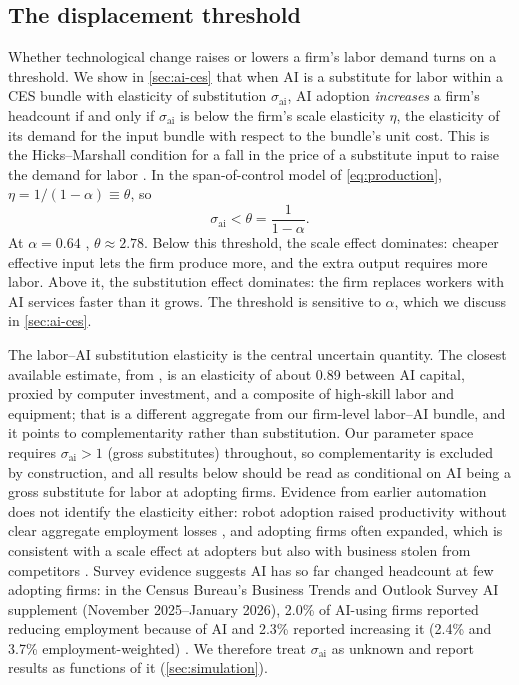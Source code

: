 \subsection{The displacement threshold}\label{sec:theory-threshold}

Whether technological change raises or lowers a firm's labor demand turns on a threshold.
We show in \cref{sec:ai-ces} that when AI is a substitute for labor within a CES bundle with elasticity of substitution $\sigma_{\text{ai}}$, AI adoption \emph{increases} a firm's headcount if and only if $\sigma_{\text{ai}}$ is below the firm's scale elasticity $\eta$, the elasticity of its demand for the input bundle with respect to the bundle's unit cost.
This is the Hicks--Marshall condition for a fall in the price of a substitute input to raise the demand for labor \citep{hamermesh1993labor}.
In the span-of-control model of \cref{eq:production}, $\eta = 1/(1-\alpha) \equiv \theta$, so
\begin{equation}\label{eq:threshold}
  \sigma_{\text{ai}} < \theta = \frac{1}{1-\alpha}.
\end{equation}
At $\alpha = 0.64$ \citep[the value in][]{hopenhayn1993job}, $\theta \approx 2.78$.
Below this threshold, the scale effect dominates: cheaper effective input lets the firm produce more, and the extra output requires more labor.
Above it, the substitution effect dominates: the firm replaces workers with AI services faster than it grows.
The threshold is sensitive to $\alpha$, which we discuss in \cref{sec:ai-ces}.

The labor--AI substitution elasticity is the central uncertain quantity.
The closest available estimate, from \citet{luduvice2026ai}, is an elasticity of about 0.89 between AI capital, proxied by computer investment, and a composite of high-skill labor and equipment; that is a different aggregate from our firm-level labor--AI bundle, and it points to complementarity rather than substitution.
Our parameter space requires $\sigma_{\text{ai}} > 1$ (gross substitutes) throughout, so complementarity is excluded by construction, and all results below should be read as conditional on AI being a gross substitute for labor at adopting firms.
Evidence from earlier automation does not identify the elasticity either: robot adoption raised productivity without clear aggregate employment losses \citep{graetz2018robots}, and adopting firms often expanded, which is consistent with a scale effect at adopters but also with business stolen from competitors \citep{acemoglu2020competing,koch2021robots}.
Survey evidence suggests AI has so far changed headcount at few adopting firms: in the Census Bureau's Business Trends and Outlook Survey AI supplement (November 2025--January 2026), 2.0\% of AI-using firms reported reducing employment because of AI and 2.3\% reported increasing it (2.4\% and 3.7\% employment-weighted) \citep{bonney2026}.
We therefore treat $\sigma_{\text{ai}}$ as unknown and report results as functions of it (\cref{sec:simulation}).
